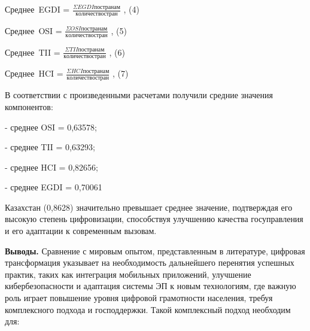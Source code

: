{%

Среднее~EGDI = \(\frac{\Sigma EGDIпостранам}{количествостран}\) , (4)

Среднее~OSI = \(\frac{\Sigma OSIпостранам}{количествостран}\) , (5)

Среднее~TII = \(\frac{\Sigma TIIпостранам}{количествостран}\) , (6)

Среднее~HCI = \(\frac{\Sigma HCIпостранам}{количествостран}\) , (7)

В соответствии с произведенными расчетами получили средние значения
компонентов:

- среднее OSI = 0,63578;

- среднее TII = 0,63293;

- среднее HCI = 0,82656;

- среднее EGDI = 0,70061

Казахстан (0,8628) значительно превышает среднее значение, подтверждая
его высокую степень цифровизации, способствуя улучшению качества
госуправления и его адаптации к современным вызовам.

{\bfseries Выводы.} Сравнение с мировым опытом, представленным в
литературе, цифровая трансформация указывает на необходимость
дальнейшего перенятия успешных практик, таких как интеграция мобильных
приложений, улучшение кибербезопасности и адаптация системы ЭП к новым
технологиям, где важную роль играет повышение уровня цифровой
грамотности населения, требуя комплексного подхода и господдержки. Такой
комплексный подход необходим для:

}
